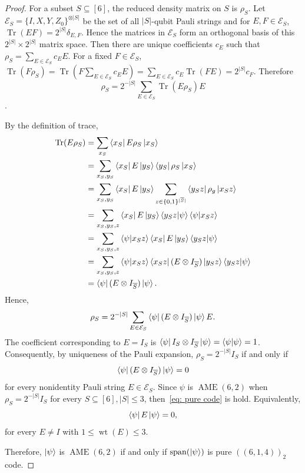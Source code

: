 \begin{proof}
    For a subset $S\subseteq [6]$, the reduced density matrix on $S$ is $\rho_S$. Let $\mathcal{E}_{S}=\{I,X,Y,Z_0\}^{\otimes \lvert S\rvert}$ be the set of all $\lvert S\rvert$-qubit Pauli strings and for $E,F\in \mathcal{E}_S$, $\operatorname{Tr}(EF)=2^{\lvert S\rvert}\delta_{E,F}$. Hence the matrices in $\mathcal{E}_S$ form an orthogonal basis of this $2^{\lvert S\rvert}\times 2^{\lvert S\rvert}$ matrix space.
    Then there are unique coefficients $c_E$ such that $\rho_S=\sum_{E\in \mathcal{E}_S} c_E E$. For a fixed $F\in \mathcal{E}_S$, $\operatorname{Tr}(F\rho_S)=\operatorname{Tr}\left(F\sum_{E\in \mathcal{E}_S }c_E E\right)=\sum_{E\in \mathcal{E}_S}c_E \operatorname{Tr}(FE)=2^{\lvert S\rvert}c_F$. Therefore 
    $$\rho_S=2^{-\lvert S\rvert}\sum_{E\in \mathcal{E}_S}\operatorname{Tr}(E\rho_S)E$$.

    By the definition of trace,
    \begin{align}
        \operatorname{Tr}(E\rho_S)&=\sum_{x_S}\bra{x_S} E\rho_S\ket{x_S}\\
        &= \sum_{x_S,y_S}\bra{x_S}E \ket{y_S}\bra{y_S}\rho_S\ket{x_S}\\
        &= \sum_{x_S,y_S} \bra{x_S}E \ket{y_S} \sum_{z\in \{0,1\}^{\lvert \overline{S}\rvert}}\bra{y_Sz}\rho_g\ket{x_Sz}\\
        &= \sum_{x_S,y_S,z}\bra{x_S}E \ket{y_S}\braket{y_Sz |\psi}\braket{\psi|x_Sz}\\
        &=\sum_{x_S,y_S,z}\braket{\psi|x_Sz} \bra{x_S}E \ket{y_S}\braket{y_Sz |\psi}\\
        &=\sum_{x_S,y_S,z}\braket{\psi|x_Sz} \bra{x_Sz}(E\otimes I_{\overline{S}}) \ket{y_Sz}\braket{y_Sz |\psi}\\
        &=\bra{\psi}(E\otimes I_{\overline{S}})\ket{\psi}.
    \end{align}
    Hence,
    \begin{equation}
        \rho_S=2^{-\lvert S\rvert}\sum_{E\in \mathcal{E}_S}\bra{\psi}(E\otimes I_{\overline{S}})\ket{\psi}E.
    \end{equation}
    The coefficient corresponding to $E=I_S$ is $\bra{\psi}I_S\otimes I_{\overline{S}}\ket{\psi}=\braket{\psi|\psi}=1$. Consequently, by uniqueness of the Pauli expansion, $\rho_S=2^{-\lvert S\rvert}I_S$ if and only if 
    \begin{equation}\label{eq: pure code}
        \bra{\psi} (E\otimes I_{\overline{S}})\ket{\psi}=0
    \end{equation}
    for every nonidentity Pauli string $E\in \mathcal{E}_S$.
    Since $\psi$ is $\operatorname{AME}(6,2)$ when $\rho_S=2^{-\lvert S\rvert}I_S$ for every $S\subseteq [6],|S|\leq 3$, then~\eqref{eq: pure code} is hold. Equivalently,
    \begin{equation}
        \bra{\psi} E\ket{\psi}=0,
    \end{equation}
    for every $E\neq I$ with $1\leq \operatorname{wt}(E)\leq 3$.

    Therefore, $\ket{\psi}$ is $\operatorname{AME}(6,2)$ if and only if $\operatorname{span}(\ket{\psi})$ is pure $((6,1,4))_2$ code.
\end{proof}

